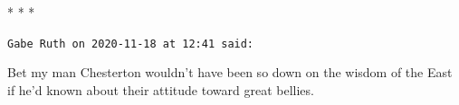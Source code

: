 
\begin{center}* * *\end{center}

\begin{footnotesize}
\begin{sffamily}
\texttt{Gabe Ruth on 2020-11-18 at 12:41 said:}

Bet my man Chesterton wouldn't have been so down on the wisdom of the East if he'd known about their attitude toward great bellies.


\hfill

\end{sffamily}
\end{footnotesize}

